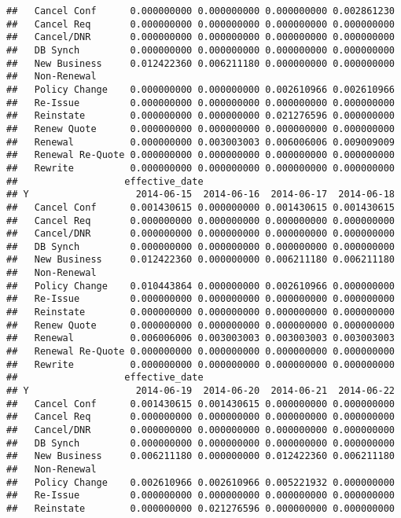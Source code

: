 \documentclass[]{article}
\begin{document}
\begin{verbatim}
##   Cancel Conf      0.000000000 0.000000000 0.000000000 0.002861230
##   Cancel Req       0.000000000 0.000000000 0.000000000 0.000000000
##   Cancel/DNR       0.000000000 0.000000000 0.000000000 0.000000000
##   DB Synch         0.000000000 0.000000000 0.000000000 0.000000000
##   New Business     0.012422360 0.006211180 0.000000000 0.000000000
##   Non-Renewal                                                     
##   Policy Change    0.000000000 0.000000000 0.002610966 0.002610966
##   Re-Issue         0.000000000 0.000000000 0.000000000 0.000000000
##   Reinstate        0.000000000 0.000000000 0.021276596 0.000000000
##   Renew Quote      0.000000000 0.000000000 0.000000000 0.000000000
##   Renewal          0.000000000 0.003003003 0.006006006 0.009009009
##   Renewal Re-Quote 0.000000000 0.000000000 0.000000000 0.000000000
##   Rewrite          0.000000000 0.000000000 0.000000000 0.000000000
##                   effective_date
## Y                   2014-06-15  2014-06-16  2014-06-17  2014-06-18
##   Cancel Conf      0.001430615 0.000000000 0.001430615 0.001430615
##   Cancel Req       0.000000000 0.000000000 0.000000000 0.000000000
##   Cancel/DNR       0.000000000 0.000000000 0.000000000 0.000000000
##   DB Synch         0.000000000 0.000000000 0.000000000 0.000000000
##   New Business     0.012422360 0.000000000 0.006211180 0.006211180
##   Non-Renewal                                                     
##   Policy Change    0.010443864 0.000000000 0.002610966 0.000000000
##   Re-Issue         0.000000000 0.000000000 0.000000000 0.000000000
##   Reinstate        0.000000000 0.000000000 0.000000000 0.000000000
##   Renew Quote      0.000000000 0.000000000 0.000000000 0.000000000
##   Renewal          0.006006006 0.003003003 0.003003003 0.003003003
##   Renewal Re-Quote 0.000000000 0.000000000 0.000000000 0.000000000
##   Rewrite          0.000000000 0.000000000 0.000000000 0.000000000
##                   effective_date
## Y                   2014-06-19  2014-06-20  2014-06-21  2014-06-22
##   Cancel Conf      0.001430615 0.001430615 0.000000000 0.000000000
##   Cancel Req       0.000000000 0.000000000 0.000000000 0.000000000
##   Cancel/DNR       0.000000000 0.000000000 0.000000000 0.000000000
##   DB Synch         0.000000000 0.000000000 0.000000000 0.000000000
##   New Business     0.006211180 0.000000000 0.012422360 0.006211180
##   Non-Renewal                                                     
##   Policy Change    0.002610966 0.002610966 0.005221932 0.000000000
##   Re-Issue         0.000000000 0.000000000 0.000000000 0.000000000
##   Reinstate        0.000000000 0.021276596 0.000000000 0.000000000

\end{verbatim}
\end{document}
